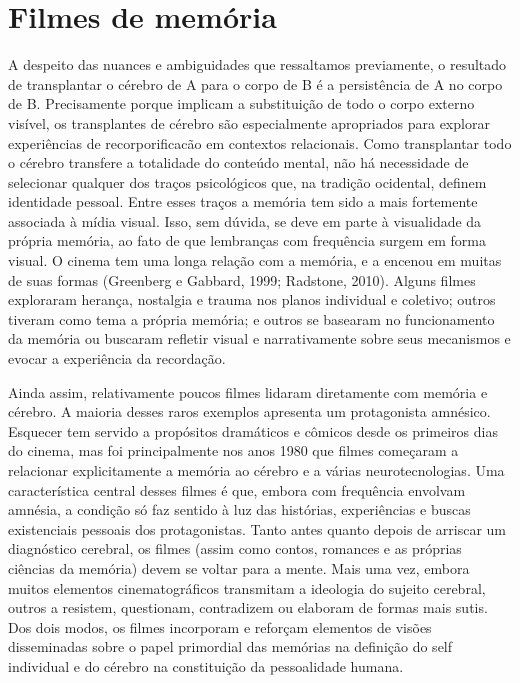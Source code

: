 \section{Filmes de memória}

A despeito das nuances e ambiguidades que ressaltamos previamente, o
resultado de transplantar o cérebro de A para o corpo de B é a
persistência de A no corpo de B. Precisamente porque implicam a
substituição de todo o corpo externo visível, os transplantes de cérebro
são especialmente apropriados para explorar experiências de
recorporificacão em contextos relacionais. Como transplantar todo o
cérebro transfere a totalidade do conteúdo mental, não há necessidade de
selecionar qualquer dos traços psicológicos que, na tradição ocidental,
definem identidade pessoal. Entre esses traços a memória tem sido a mais
fortemente associada à mídia visual. Isso, sem dúvida, se deve em parte
à visualidade da própria memória, ao fato de que lembranças com
frequência surgem em forma visual. O cinema tem uma longa relação com a
memória, e a encenou em muitas de suas formas (Greenberg e Gabbard,
1999; Radstone, 2010). Alguns filmes exploraram herança, nostalgia e
trauma nos planos individual e coletivo; outros tiveram como tema a
própria memória; e outros se basearam no funcionamento da memória ou
buscaram refletir visual e narrativamente sobre seus mecanismos e evocar
a experiência da recordação.

Ainda assim, relativamente poucos filmes lidaram diretamente com memória
e cérebro. A maioria desses raros exemplos apresenta um protagonista
amnésico. Esquecer tem servido a propósitos dramáticos e cômicos desde
os primeiros dias do cinema, mas foi principalmente nos anos 1980 que
filmes começaram a relacionar explicitamente a memória ao cérebro e a
várias neurotecnologias. Uma característica central desses filmes é que,
embora com frequência envolvam amnésia, a condição só faz sentido à luz
das histórias, experiências e buscas existenciais pessoais dos
protagonistas. Tanto antes quanto depois de arriscar um diagnóstico
cerebral, os filmes (assim como contos, romances e as próprias ciências
da memória) devem se voltar para a mente. Mais uma vez, embora muitos
elementos cinematográficos transmitam a ideologia do sujeito cerebral,
outros a resistem, questionam, contradizem ou elaboram de formas mais
sutis. Dos dois modos, os filmes incorporam e reforçam elementos de
visões disseminadas sobre o papel primordial das memórias na definição
do self individual e do cérebro na constituição da pessoalidade humana.


